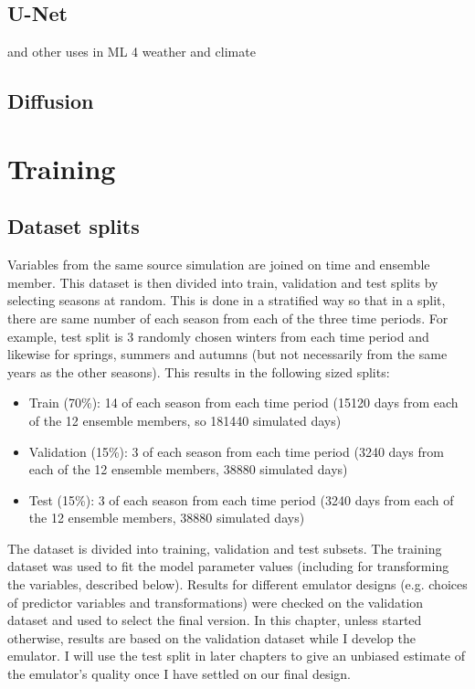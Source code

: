 \subsection{U-Net}

\textcite{Ronneberger2015unet} and other uses in ML 4 weather and climate

\subsection{Diffusion}

\textcite{song2021sbgmsde}

\section{Training}

\subsection{Dataset splits}

Variables from the same source simulation are joined on time and ensemble member. This dataset is then divided into train, validation and test splits by selecting seasons at random. This is done in a stratified way so that in a split, there are same number of each season from each of the three time periods. For example, test split is 3 randomly chosen winters from each time period and likewise for springs, summers and autumns (but not necessarily from the same years as the other seasons). This results in the following sized splits:

\begin{itemize}
    \item Train (70\%): 14 of each season from each time period (15120 days from each of the 12 ensemble members, so 181440 simulated days)
    \item Validation (15\%): 3 of each season from each time period (3240 days from each of the 12 ensemble members, 38880 simulated days)
    \item Test (15\%): 3 of each season from each time period (3240 days from each of the 12 ensemble members, 38880 simulated days)
\end{itemize}

The dataset is divided into training, validation and test subsets.
The training dataset was used to fit the model parameter values (including for transforming the variables, described below). Results for different emulator designs (e.g. choices of predictor variables and transformations) were checked on the validation dataset and used to select the final version. In this chapter, unless started otherwise, results are based on the validation dataset while I develop the emulator. I will use the test split in later chapters to give an unbiased estimate of the emulator's quality once I have settled on our final design.

